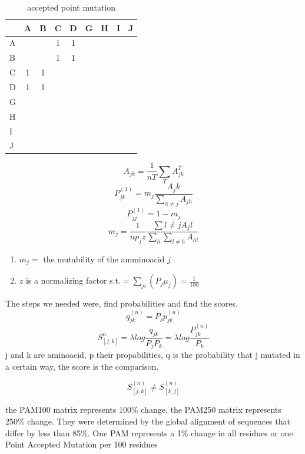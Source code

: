 \documentclass[11pt]{article}
\begin{document}
\begin{table}[tb]
	\caption{accepted point mutation}
	\label{tab:tablename}
	\centering

	\begin{tabular}{l|cccccccc}
	\hline

	\hline
		 & A & B & C & D & G & H & I & J \\
	\hline
		A&   &   & 1 & 1 & & & & \\
		B&   &   & 1 & 1 & & & & \\
		C& 1 & 1 &  & & & & & \\
		D& 1 & 1 &  & & & & & \\
		G&  &  &  & & & & & \\
		H&  &  &  & & & & & \\
		I&  &  &  & & & & & \\
		J&  &  &  & & & & & \\
	\hline

	\hline
	\end{tabular}
\end{table}

\[
	A_{jk} = \frac{1} {nT} \sum_{T} A_{jk}^{T}
\]
\[
	P_{jk}^{(1)} = m_j \frac{A_jk}{\sum_{h \neq j} A_{jh}}
\]
\[
	P_{jj}^{(1)} = 1 -m_j 
\]
\[
	m_j = \frac{1}{n p_j z} \frac{\sum {l \neq j }A_j l}{\sum_h \sum_{l \neq h} A_{hl} }
\]

\begin{enumerate}
	\item $m_j = $ the mutability of the amminoacid $j$ 
	\item $z$ is a normalizing factor s.t.$ = \sum_{ji}(P_j \mu_j) = \frac{1}{100}$
\end{enumerate}

The steps we needed were, find probabilities and find the scores.
\[
	q_{jk}^{(n)} = P_j p_{jk}^{(n)}
\]
\[
	S_{[j,k]}^n = \lambda log \frac{q_{jk}} {P_j P_k} = \lambda log \frac{P_{jk}^{(n)}}{P_k}
\]
j and k are aminoacid, p their propabilities,
q is the probability that j mutated in a certain way, the score is the comparison.

\[
	S_{[j,k]}^{(n)} \neq S_{[k,j]} ^{(n)}
\]

the PAM100 matrix represents 100\% change, the PAM250 matrix represents 250\% change.
They were determined by the global alignment of sequences that differ by less than 85\%. One PAM represents a 1\% change in all residues or one Point Accepted Mutation per 100 residues
\end{document}
